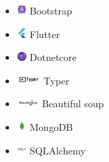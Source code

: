 \documentclass{article}
\begin{document}
\begin{multicols}{3}
\begin{itemize}
    \item \includegraphics[height=10pt]{images/icons/bootstrap.png} Bootstrap
    \item \includegraphics[height=10pt]{images/icons/flutter-original.png} Flutter
    \item \includegraphics[height=10pt]{images/icons/dotnetcore.png} Dotnetcore
    \item \includegraphics[height=10pt]{images/icons/typer.png} Typer
    \item \includegraphics[height=10pt]{images/icons/bs.png} Beautiful soup
    \item \includegraphics[height=10pt]{images/icons/mongodb-original.png} MongoDB
    \item \includegraphics[height=10pt]{images/icons/sqlalchemy-original.png} SQLAlchemy
\end{itemize}

\end{multicols}





\end{document}
